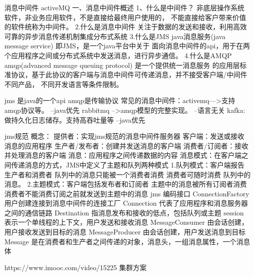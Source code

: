 消息中间件 activeMQ
一、消息中间件概述
	1、什么是中间件？
		非底层操作系统软件，非业务应用软件，不是直接给最终用户使用的，
		不能直接给客户带来价值的软件统称为中间件。
	2.什么是消息中间件
		关注于数据的发送和接收，利用高效可靠的异步消息传递机制集成分布式系统
	3.什么是JMS
		java消息服务(java message service) 即JMS，是一个java平台中关于
		面向消息中间件的api，用于在两个应用程序之间或分布式系统中发送消息，进行异步通信。
	4.什么是AMQP
		amqp(advanced message queuing protocol) 是一个提供统一消息服务
		的应用层标准协议，基于此协议的客户端与消息中间件可传递消息，并不接受客户端/中间件不同产品，
		不同开发语言等条件限制。
		
		jms 是java的一个api  amqp是传输协议
		常见的消息中间件：activemq--->支持amqp协议等。
							  --java优先
					 rabbitmq -->amqp模型的完整实现。
					 		  --语言无关
					 kafka:做持久化日志储存。支持高吞吐量等
					 		  --java优先
					 		  
	jms规范
		概念：
			提供者：实现jms规范的消息中间件服务器
			客户端：发送或接收消息的应用程序
			生产者/发布者：创建并发送消息的客户端
			消费者/订阅者：接收并处理消息的客户端
			消息：应用程序之间传递数据的内容
			消息模式：在客户端之间传递消息的方式，JMS中定义了主题和队列两种模式
				1.队列模式：客户端报告生产者和消费者
						 队列中的消息只能被一个消费者消费
						 消费者可随时消费 队列中的消息。
				2.主题模式：客户端包括发布者和订阅者
						 主题中的消息被所有订阅者消费
						 消费者不能消费订阅之前就发送到主题中的消息
		 jms 编码接口
		 	ConnectionFactory 用户创建连接到消息中间件的连接工厂
		 	Connection 代表了应用程序和消息服务器之间的通信链路
		 	Destination 指消息发布和接收的低点，包括队列或主题
		 	session 表示一个单线程的上下文，用户发送和接收消息
		 	MessageConsumer 由会话创建，用户接收发送到目标的消息
		 	MessageProducer 由会话创建，用户发送消息到目标
		 	Message 是在消费者和生产者之间传递的对象，消息头，一组消息属性，一个消息体
		 	
https://www.imooc.com/video/15225  集群方案
						 
		

	
